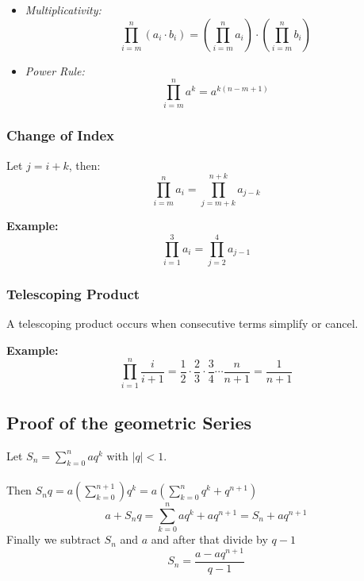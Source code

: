 \begin{itemize}[label=\(-\)]
    \item \emph{Multiplicativity:}
    \[
    \prod_{i = m}^{n} (a_i \cdot b_i) = \left( \prod_{i = m}^{n} a_i \right) \cdot \left( \prod_{i = m}^{n} b_i \right)
    \]
    \item \emph{Power Rule:}
    \[
    \prod_{i = m}^{n} a^k = a^{k(n - m + 1)}
    \]
\end{itemize}

\subsubsection{Change of Index}

Let \(j = i + k\), then:
\[
\prod_{i = m}^{n} a_i = \prod_{j = m + k}^{n + k} a_{j - k}
\]

\textbf{Example:}
\[
\prod_{i = 1}^{3} a_i = \prod_{j = 2}^{4} a_{j - 1}
\]

\subsubsection{Telescoping Product}

A telescoping product occurs when consecutive terms simplify or cancel.

\textbf{Example:}
\[
\prod_{i = 1}^{n} \frac{i}{i+1} = \frac{1}{2} \cdot \frac{2}{3} \cdot \frac{3}{4} \cdots \frac{n}{n+1} = \frac{1}{n+1}
\]


\subsection{Proof of the geometric Series}

Let \(S_n = \sum_{k = 0}^{n}aq^k\) with \(|q| < 1\).
\\\\
Then \(S_n q = a(\sum_{k = 0}^{n + 1})q^k = a\left( \sum_{k= 0}^{n} q^k + q^{n + 1}\right)\)
\[
a + S_nq = \sum_{k = 0}^{n}aq^k + aq^{n + 1}  = S_n + aq^{n + 1}
\]
Finally we subtract \(S_n\) and \(a\) and after that divide by \(q - 1\)
\[
S_n = \frac{a - aq^{n + 1}}{q - 1}
\]
\QED
\newpage